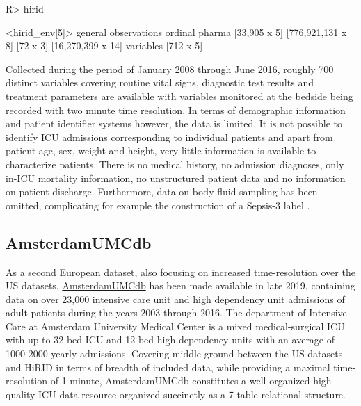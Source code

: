 \documentclass[
  notitle]{jss}
\begin{document}
\begin{CodeChunk}
\begin{CodeInput}
R> hirid
\end{CodeInput}
\begin{CodeOutput}
<hirid_env[5]>
          general      observations           ordinal            pharma 
     [33,905 x 5] [776,921,131 x 8]          [72 x 3] [16,270,399 x 14] 
        variables 
        [712 x 5] 
\end{CodeOutput}
\end{CodeChunk}

Collected during the period of January 2008 through June 2016, roughly
700 distinct variables covering routine vital signs, diagnostic test
results and treatment parameters are available with variables monitored
at the bedside being recorded with two minute time resolution. In terms
of demographic information and patient identifier systems however, the
data is limited. It is not possible to identify ICU admissions
corresponding to individual patients and apart from patient age, sex,
weight and height, very little information is available to characterize
patients. There is no medical history, no admission diagnoses, only
in-ICU mortality information, no unstructured patient data and no
information on patient discharge. Furthermore, data on body fluid
sampling has been omitted, complicating for example the construction of
a Sepsis-3 label \citep{singer2016}.

\hypertarget{amsterdamumcdb}{%
\subsection{AmsterdamUMCdb}\label{amsterdamumcdb}}

As a second European dataset, also focusing on increased time-resolution
over the US datasets,
\href{https://amsterdammedicaldatascience.nl/\#amsterdamumcdb}{AmsterdamUMCdb}
has been made available in late 2019, containing data on over 23,000
intensive care unit and high dependency unit admissions of adult
patients during the years 2003 through 2016. The department of Intensive
Care at Amsterdam University Medical Center is a mixed medical-surgical
ICU with up to 32 bed ICU and 12 bed high dependency units with an
average of 1000-2000 yearly admissions. Covering middle ground between
the US datasets and HiRID in terms of breadth of included data, while
providing a maximal time-resolution of 1 minute, AmsterdamUMCdb
constitutes a well organized high quality ICU data resource organized
succinctly as a 7-table relational structure.
\end{document}
